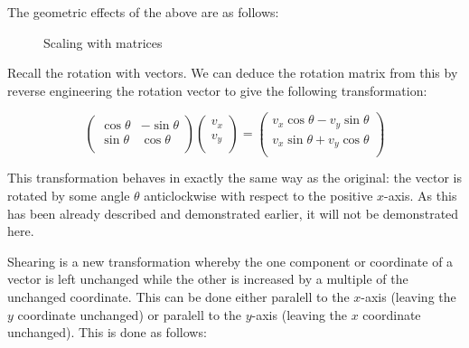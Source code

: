 \documentclass[a4paper,oneside]{report}
\begin{document}
The geometric effects of the above are as follows:

\begin{figure}[h]
	\centering

	Scaling with matrices
\end{figure}

Recall the rotation with vectors. We can deduce the rotation matrix from this
by reverse engineering the rotation vector to give the following
transformation:

\[ \begin{pmatrix}
	\cos{\theta} & -\sin{\theta} \\
	\sin{\theta} & \cos{\theta} \\
\end{pmatrix} \begin{pmatrix}
	v_x \\
	v_y \\
\end{pmatrix} = \begin{pmatrix}
	v_x \cos{\theta} - v_y \sin{\theta} \\
	v_x \sin{\theta} + v_y \cos{\theta} \\
\end{pmatrix} \]

This transformation behaves in exactly the same way as the original: the
vector is rotated by some angle \( \theta \) anticlockwise with respect to
the positive \( x \)-axis. As this has been already described and
demonstrated earlier, it will not be demonstrated here.

Shearing is a new transformation whereby the one component or coordinate of
a vector is left unchanged while the other is increased by a multiple of the
unchanged coordinate. This can be done either paralell to the \( x \)-axis
(leaving the \( y \) coordinate unchanged) or paralell to the \( y \)-axis
(leaving the \( x \) coordinate unchanged). This is done as follows:
\end{document}

